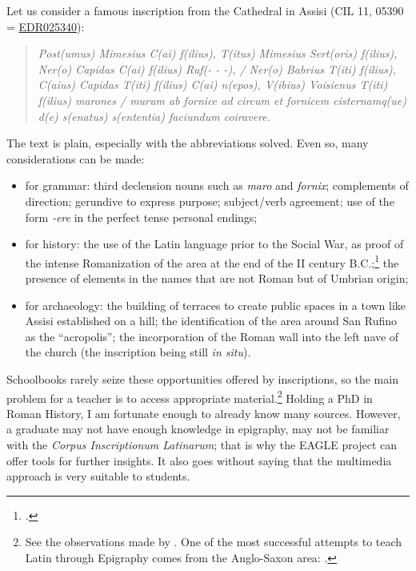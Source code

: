 \documentclass[amsthm,ebook]{saparticle}
\begin{document}
Let us consider a famous inscription from the Cathedral in Assisi (CIL 11, 05390 = \href{http://www.edr-edr.it/edr\_programmi/res\_complex\_comune.php?do=book\&id\_nr=EDR025340}{EDR025340}):

\begin{quotation}
\emph{Post(umus) Mimesius C(ai) f(ilius), T(itus) Mimesius Sert(oris) f(ilius), Ner(o) Capidas C(ai) f(ilius) Ruf(- - -), /
Ner(o) Babrius T(iti) f(ilius), C(aius) Capidas T(iti) f(ilius) C(ai) n(epos), V(ibius) Voisienus T(iti) f(ilius)
marones / murum ab fornice ad circum et fornicem cisternamq(ue) d(e) s(enatus) s(ententia) faciundum coiravere.}

\end{quotation}
The text is plain, especially with the abbreviations solved. Even so, many considerations can be
made:

\begin{itemize}
\item for grammar: third declension nouns such as \emph{maro} and \emph{fornix}; complements of direction; gerundive to express
purpose; subject/verb agreement; use of the form {}\emph{-ere} in the perfect tense personal endings;
\item for history: the use of the Latin language prior to the Social War, as proof of the intense Romanization of the
area at the end of the II century B.C.;\footnote{\citet{Coarelli1991}.} the presence of elements in the names that are not
Roman but of Umbrian origin;
\item for archaeology: the building of terraces to create public spaces in a town like Assisi established on a hill; the
identification of the area around San Rufino as the ``acropolis''; the incorporation of the Roman wall into the left nave
of the church (the inscription being still \emph{in situ}).
\end{itemize}



Schoolbooks rarely seize these opportunities offered by inscriptions, so the main problem for a teacher is to access
appropriate material.\footnote{ See the observations made by \citet{Carpenter2006}. One of the most successful attempts to teach Latin through Epigraphy comes from the Anglo-Saxon area: \citet{LaFleur2010}.} Holding a PhD in Roman History, I am fortunate enough to already know many sources. However, a graduate may not have enough
knowledge in epigraphy, may not be familiar with the \emph{Corpus Inscriptionum Latinarum}; that is why the EAGLE project can offer tools for further insights. It also goes without saying that the multimedia approach is very suitable to students.
\end{document}
